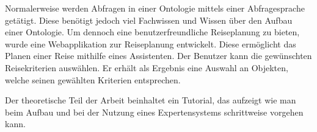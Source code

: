 \documentclass[
    paper=a4,               %
    fontsize=10pt,          %
    open=right,             %
    titlepage=false,        %
    parskip=half,           %
]{scrreprt}                 %
\begin{document}
\begin{multicols}{3}
        Normalerweise werden Abfragen in einer Ontologie mittels einer Abfragesprache getätigt. Diese benötigt jedoch viel Fachwissen und Wissen über den Aufbau einer Ontologie. Um dennoch eine benutzerfreundliche Reiseplanung zu bieten, wurde eine Webapplikation zur Reiseplanung entwickelt. Diese ermöglicht das Planen einer Reise mithilfe eines Assistenten. Der Benutzer kann die gewünschten Reisekriterien auswählen. Er erhält als Ergebnis eine Auswahl an Objekten, welche seinen gewählten Kriterien entsprechen.

       Der theoretische Teil der Arbeit beinhaltet ein Tutorial, das aufzeigt wie man beim Aufbau und bei der Nutzung eines Expertensystems schrittweise vorgehen kann.

    \end{multicols}

\end{document}
